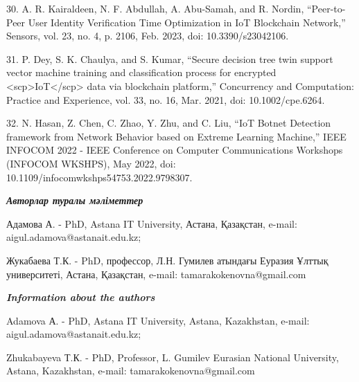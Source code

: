 30. A. R. Kairaldeen, N. F. Abdullah, A. Abu-Samah, and R. Nordin,
``Peer-to-Peer User Identity Verification Time Optimization in IoT
Blockchain Network,'' Sensors, vol. 23, no. 4, p. 2106, Feb. 2023, doi:
10.3390/s23042106.

31. P. Dey, S. K. Chaulya, and S. Kumar, ``Secure decision tree twin
support vector machine training and classification process for encrypted
\textless scp\textgreater IoT\textless/scp\textgreater{} data via
blockchain platform,'' Concurrency and Computation: Practice and
Experience, vol. 33, no. 16, Mar. 2021, doi: 10.1002/cpe.6264.

32. N. Hasan, Z. Chen, C. Zhao, Y. Zhu, and C. Liu, ``IoT Botnet
Detection framework from Network Behavior based on Extreme Learning
Machine,'' IEEE INFOCOM 2022 - IEEE Conference on Computer
Communications Workshops (INFOCOM WKSHPS), May 2022, doi:
10.1109/infocomwkshps54753.2022.9798307.

\emph{{\bfseries Авторлар туралы мәліметтер}}

Адамова А. - PhD, Astana IT University, Астана, Қазақстан, e-mail:
aigul.adamova@astanait.edu.kz;

Жукабаева Т.К. - PhD, профессор, Л.Н. Гумилев атындағы Еуразия Ұлттық
университеті, Астана, Қазақстан, e-mail: tamarakokenovna@gmail.com

\emph{{\bfseries Information about the authors}}

Adamova А. - PhD, Astana IT University, Astana, Kazakhstan, e-mail:
aigul.adamova@astanait.edu.kz;

Zhukabayeva Т.К. - PhD, Professor, L. Gumilev Eurasian National
University, Astana, Kazakhstan, e-mail: tamarakokenovna@gmail.com






